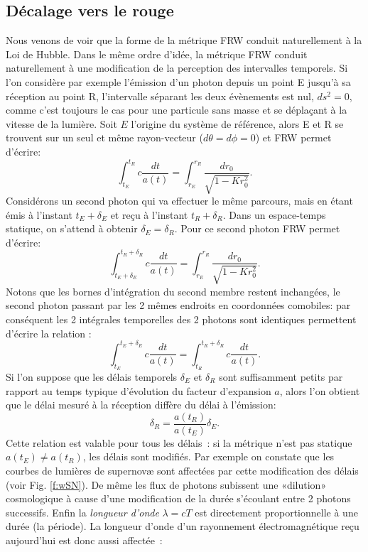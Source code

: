 \subsection{Décalage vers le rouge}
Nous venons de voir que la forme de la métrique FRW conduit naturellement à la Loi de Hubble. Dans le même ordre d'idée, la métrique FRW conduit naturellement à une modification de la perception des intervalles temporels. Si l'on considère par exemple l'émission d'un photon depuis un point E jusqu'à sa réception au point R, l'intervalle séparant les deux évènements est nul, $ds^2=0$, comme c'est toujours le cas pour une particule sans masse et se déplaçant à la vitesse de la lumière. Soit $E$ l'origine du système de référence, alors E et R se trouvent sur un seul et même rayon-vecteur ($d\theta=d\phi=0$) et FRW permet d'écrire:
\begin{equation}
\int_{t_E}^{t_R}c\frac{dt}{a(t)}=\int_{r_E}^{r_R}\frac{ dr_0}{\sqrt{1-Kr_0^2}}.
\end{equation}
Considérons un second photon qui va effectuer le même parcours, mais en étant émis à l'instant $t_E+\delta_E$ et reçu à l'instant $t_R+\delta_R$. Dans un espace-temps statique, on s'attend à obtenir $\delta_E=\delta_R$. Pour ce second photon FRW permet d'écrire:
\begin{equation}
\int_{t_E+\delta_E}^{t_R+\delta_R}c\frac{dt}{a(t)}=\int_{r_E}^{r_R}\frac{ dr_0}{\sqrt{1-Kr_0^2}}.
\end{equation}
Notons que les bornes d'intégration du second membre restent inchangées, le second photon passant par les 2 mêmes endroits en coordonnées comobiles: par conséquent les 2 intégrales temporelles des 2 photons sont identiques permettent d'écrire la relation :
\begin{equation}
\int_{t_E}^{t_E+\delta_E}c\frac{dt}{a(t)}=\int_{t_R}^{t_R+\delta_R}c\frac{dt}{a(t)}.
\end{equation}
Si l'on suppose que les délais temporels $\delta_E$ et $\delta_R$ sont suffisamment petits par rapport au temps typique d'évolution du facteur d'expansion $a$, alors l'on obtient que le délai mesuré à la réception diffère du délai à l'émission:
\begin{equation}
\delta_R=\frac{a(t_R)}{a(t_E)} \delta_E.
\end{equation}
Cette relation est valable pour tous les délais~: si la métrique n'est pas statique $a(t_E)\neq a(t_R)$, les délais sont modifiés. Par exemple on constate que les courbes de lumières de supernovæ sont affectées par cette modification des délais (voir Fig. \ref{f:wSN}). De même les flux de photons subissent une «dilution» cosmologique à cause d'une modification de la durée s'écoulant entre 2 photons successifs. Enfin la \textit{longueur d'onde} $\lambda=cT$ est directement proportionnelle à une durée (la période). La longueur d'onde d'un rayonnement électromagnétique reçu aujourd'hui est donc aussi affectée~:
